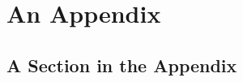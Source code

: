 \documentclass[numbered,pdftex]{ohio-etd}
\begin{document}
%
%
%
%
%
%




\appendix           %

\chapter{An Appendix}
\section{A Section in the Appendix}
\end{document}
